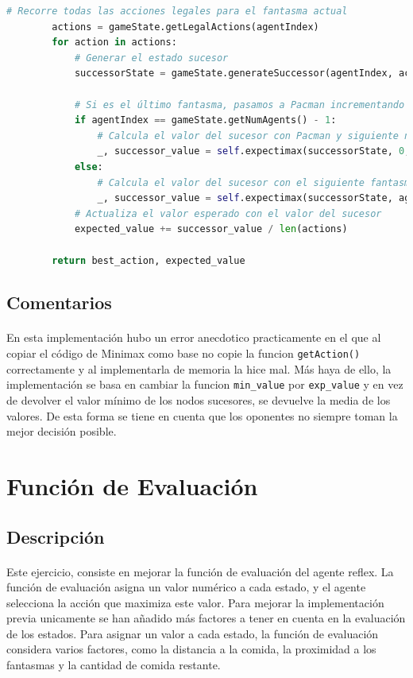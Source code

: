 \documentclass{report}
\begin{document}
\begin{lstlisting}[language=Python, caption=Implementación final del agente Expectimax]
        # Recorre todas las acciones legales para el fantasma actual
        actions = gameState.getLegalActions(agentIndex)
        for action in actions:
            # Generar el estado sucesor
            successorState = gameState.generateSuccessor(agentIndex, action)
            
            # Si es el último fantasma, pasamos a Pacman incrementando la profundidad
            if agentIndex == gameState.getNumAgents() - 1:
                # Calcula el valor del sucesor con Pacman y siguiente nivel de profundidad
                _, successor_value = self.expectimax(successorState, 0, depth + 1)
            else:
                # Calcula el valor del sucesor con el siguiente fantasma
                _, successor_value = self.expectimax(successorState, agentIndex + 1, depth)
            # Actualiza el valor esperado con el valor del sucesor
            expected_value += successor_value / len(actions)

        return best_action, expected_value            
            \end{lstlisting}
        \subsection*{Comentarios}
          \paragraph*{}{
            En esta implementación hubo un error anecdotico practicamente en el que al copiar el código de Minimax como base no copie la funcion \texttt{getAction()} correctamente y al implementarla de memoria la hice mal.
            Más haya de ello, la implementación se basa en cambiar la funcion \texttt{min\_value} por \texttt{exp\_value} y en vez de devolver el valor mínimo de los nodos sucesores, se devuelve la media de los valores.
            De esta forma se tiene en cuenta que los oponentes no siempre toman la mejor decisión posible.
          }
      \clearpage\section{Función de Evaluación}
        \subsection*{Descripción}
          \paragraph*{}{
            Este ejercicio, consiste en mejorar la función de evaluación del agente reflex. 
            La función de evaluación asigna un valor numérico a cada estado, y el agente selecciona la acción que maximiza este valor. 
            Para mejorar la implementación previa unicamente se han añadido más factores a tener en cuenta en la evaluación de los estados.
            Para asignar un valor a cada estado, la función de evaluación considera varios factores, como la distancia a la comida, la proximidad a los fantasmas y la cantidad de comida restante.
          }
\end{document}
